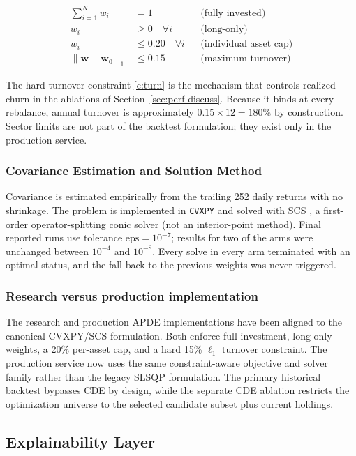 \documentclass[conference]{IEEEtran}
\begin{document}
\begin{align}
\sum_{i=1}^{N} w_i &= 1 && \text{(fully invested)} \label{c:full}\\
w_i &\ge 0 \quad \forall i && \text{(long-only)} \label{c:long}\\
w_i &\le 0.20 \quad \forall i && \text{(individual asset cap)} \label{c:cap}\\
\|\mathbf{w} - \mathbf{w}_0\|_1 &\le 0.15 && \text{(maximum turnover)} \label{c:turn}
\end{align}

The hard turnover constraint \eqref{c:turn} is the mechanism that
controls realized churn in the ablations of
Section~\ref{sec:perf-discuss}. Because it binds at every rebalance,
annual turnover is approximately $0.15\times 12=180\%$ by construction.
Sector limits are not part of the backtest formulation; they exist only
in the production service.

\subsubsection{Covariance Estimation and Solution Method}
Covariance is estimated empirically from the trailing 252 daily returns
with no shrinkage. The problem is implemented in \texttt{CVXPY}
\cite{diamond2016} and solved with SCS \cite{odonoghue2016}, a
first-order operator-splitting conic solver (not an interior-point
method). Final reported runs use tolerance $\mathrm{eps}=10^{-7}$;
results for two of the arms were unchanged between $10^{-4}$ and
$10^{-8}$. Every solve in every arm terminated with an optimal status,
and the fall-back to the previous weights was never triggered.

\subsubsection{Research versus production implementation}
The research and production APDE implementations have been aligned to
the canonical CVXPY/SCS formulation. Both enforce full investment,
long-only weights, a 20\% per-asset cap, and a hard 15\% $\ell_1$
turnover constraint. The production service now uses the same
constraint-aware objective and solver family rather than the legacy
SLSQP formulation. The primary historical backtest bypasses CDE by
design, while the separate CDE ablation restricts the optimization
universe to the selected candidate subset plus current holdings.

\subsection{Explainability Layer}
\label{sec:xai}
\end{document}

